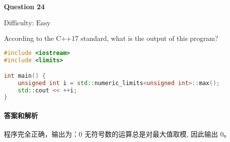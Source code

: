 \documentclass{article}
\begin{document}
	\paragraph*{Question 24} $\boxed{\text{Difficulty: Easy}} $			
	
	According to the C++17 standard, what is the output of this program?
	
	\begin{lstlisting}[language=C++]  		
#include <iostream>
#include <limits>

int main() {
	unsigned int i = std::numeric_limits<unsigned int>::max();
	std::cout << ++i;
}
	\end{lstlisting}
	
	\paragraph*{答案和解析} $\boxed{\text{程序完全正确，输出为：0}} $
	无符号数的运算总是对最大值取模, 因此输出 0。
\end{document}
